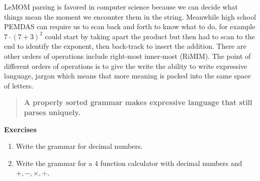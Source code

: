 LeMOM parsing is favored in computer science because we can 
decide what things mean the moment we encounter them in the string.
Meanwhile high school PEMDAS can require us to scan back and forth 
to know what to do, for example $7\cdot (7+3)^2$ could start by taking 
apart the product but then had to scan to the end to identify the exponent,
then back-track to insert the addition.  
There are other orders of operations include right-most inner-most (RiMIM).
The point of different orders of operations is to give the write the ability 
to write expressive language, jargon which means that more meaning is packed 
into the same space of letters.

\begin{quote}
\textbf{A properly sorted grammar makes expressive language 
that still parses uniquely.}
\end{quote}

\noindent\textbf{Exercises}
\begin{enumerate}
    \item Write the grammar for decimal numbers.
    \item Write the grammar for a 4 function calculator with decimal numbers
    and $+,-,\times, \div$.
\end{enumerate}
\medskip

